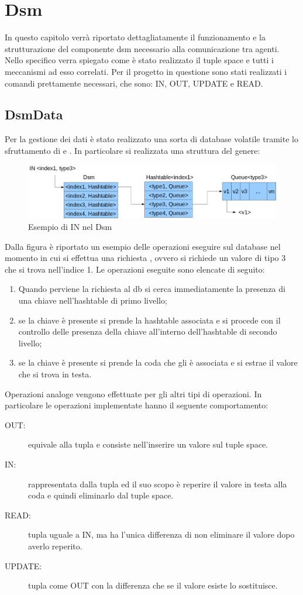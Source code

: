 \chapter{Dsm}
In questo capitolo verrà riportato dettagliatamente il funzionamento e la strutturazione del componente dsm necessario alla comunicazione tra agenti.
Nello specifico verra spiegato come è stato realizzato il tuple space e tutti i meccanismi ad esso correlati.
Per il progetto in questione sono stati realizzati i comandi prettamente necessari, che sono: IN, OUT, UPDATE e READ. 
\section{DsmData}
Per la gestione dei dati è stato realizzato una sorta di database volatile tramite lo sfruttamento di  e . In particolare si realizzata una struttura del genere:
\begin{figure}[H]
\begin{center}
\includegraphics[scale=0.3]{etc/dsm.png}
\caption{Esempio di IN nel Dsm}
\label{dsm}
\end{center}
\end{figure}
Dalla figura è riportato un esempio delle operazioni eseguire sul database nel momento in cui si effettua una richiesta , ovvero si richiede un valore di tipo 3 che si trova nell'indice 1. Le operazioni eseguite sono elencate di seguito:
\begin{enumerate}
	\item Quando perviene la richiesta al db si cerca immediatamente la presenza di una chiave  nell'hashtable di primo livello;
	\item se la chiave è presente si prende la hashtable associata e si procede con il controllo delle presenza della chiave  all'interno dell'hashtable di secondo livello;
	\item se la chiave è presente si prende la coda che gli è associata e si estrae il valore che si trova in testa.
\end{enumerate}
Operazioni analoge vengono effettuate per gli altri tipi di operazioni. In particolare le operazioni implementate hanno il seguente comportamento:
\begin{description}
	\item[OUT:] equivale alla tupla  e consiste nell'inserire un valore sul tuple space.
	\item[IN:] rappresentata dalla tupla  ed il suo scopo è reperire il valore in testa alla coda e quindi eliminarlo dal tuple space.
	\item[READ:] tupla uguale a IN, ma ha l'unica differenza di non eliminare il valore dopo averlo reperito.
	\item[UPDATE:] tupla come OUT con la differenza che se il valore esiste lo sostituisce.
\end{description}
